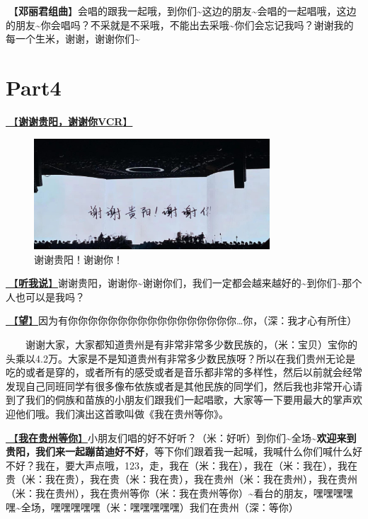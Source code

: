 \documentclass[]{ctexbook}
\begin{document}
🎵【\textbf{邓丽君组曲}】会唱的跟我一起哦，到你们\textasciitilde 这边的朋友\textasciitilde 会唱的一起唱哦，这边的朋友\textasciitilde 你会唱吗？不采就是不采哦，不能出去采哦\textasciitilde 你们会忘记我吗？谢谢我的每一个生米，谢谢，谢谢你们\textasciitilde{}

\section{Part4}\label{guiyang-20240713-part4}

\hyperref[thank-you-vcr]{🎥【\textbf{谢谢贵阳，谢谢你VCR}】}

\begin{figure}

{\centering \includegraphics[width=250pt]{img/guiyang20240713/thank-guiyang} 

}

\caption{谢谢贵阳！谢谢你！}\label{fig:unnamed-chunk-54}
\end{figure}

\hyperref[listen-to-me]{🎵【\textbf{听我说}】}谢谢贵阳，谢谢你\textasciitilde 谢谢你们，我们一定都会越来越好的\textasciitilde 到你们\textasciitilde 那个人也可以是我吗？

\hyperref[hope]{🎵【\textbf{望}】}因为有你你你你你你你你你你你你你你你你你\ldots 你，（深：我才心有所住）

  谢谢大家，大家都知道贵州是有非常非常多少数民族的，（米：宝贝）宝你的头乘以4.2万。大家是不是知道贵州有非常多少数民族呀？所以在我们贵州无论是吃的或者是穿的，或者所有的感受或者是音乐都非常的多样性，然后以前就会经常发现自己同班同学有很多像布依族或者是其他民族的同学们，然后我也非常开心请到了我们的侗族和苗族的小朋友们跟我们一起唱歌，大家等一下要用最大的掌声欢迎他们哦。我们演出这首歌叫做《我在贵州等你》。

\hyperref[waitting-in-guizhou]{🎵【\textbf{我在贵州等你}】}小朋友们唱的好不好听？（米：好听）到你们\textasciitilde 全场\textasciitilde{}\textbf{欢迎来到贵阳，我们来一起蹦苗迪好不好}，等下你们跟着我一起喊，我喊什么你们喊什么好不好？我在，要大声点哦，123，走，我在（米：我在），我在（米：我在），我在贵（米：我在贵），我在贵（米：我在贵），我在贵州（米：我在贵州），我在贵州（米：我在贵州），我在贵州等你（米：我在贵州等你）\textasciitilde 看台的朋友，嘿嘿嘿嘿嘿\textasciitilde 全场，嘿嘿嘿嘿嘿（米：嘿嘿嘿嘿嘿）我们在贵州（深：等你）
\end{document}
